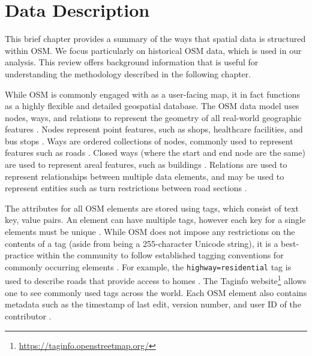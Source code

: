 \chapter{Data Description}
\label{chapterlabel3}
This brief chapter provides a summary of the ways that spatial data is structured within OSM. We focus particularly on historical OSM data, which is used in our analysis. This review offers background information that is useful for understanding the methodology described in the following chapter. 

While OSM is commonly engaged with as a user-facing map, it in fact functions as a highly flexible and detailed geospatial database. The OSM data model uses nodes, ways, and relations to represent the geometry of all real-world geographic features \parencite{noauthor_elements_2020}. Nodes represent point features, such as shops, healthcare facilities, and bus stops \parencite{noauthor_node_2019}. Ways are ordered collections of nodes, commonly used to represent features such as roads \parencite{noauthor_way_2020}. Closed ways (where the start and end node are the same) are used to represent areal features, such as buildings \parencite{noauthor_way_2020}. Relations are used to represent relationships between multiple data elements, and may be used to represent entities such as turn restrictions between road sections \parencite{noauthor_relation_2019}. 

The attributes for all OSM elements are stored using tags, which consist of text key, value pairs. An element can have multiple tags, however each key for a single elements must be unique \parencite{noauthor_tags_2020}. While OSM does not impose any restrictions on the contents of a tag (aside from being a 255-character Unicode string), it is a best-practice within the community to follow established tagging conventions for commonly occurring elements \parencite{noauthor_tags_2020}. For example, the \texttt{highway=residential} tag is used to describe roads that provide access to homes \parencite{noauthor_elements_2020}. The Taginfo website\footnote{\url{https://taginfo.openstreetmap.org/}} allows one to see commonly used tags across the world. Each OSM element also contains metadata such as the timestamp of last edit, version number, and user ID of the contributor \parencite{noauthor_elements_2020}. 


